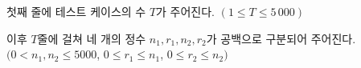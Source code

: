첫째 줄에 테스트 케이스의 수 $T$가 주어진다. $(1 \le T \le 5\,000)$

이후 $T$줄에 걸쳐 네 개의 정수 $n_1, r_1, n_2, r_2$가 공백으로 구분되어 주어진다. $(0 < n_1, n_2 \leq 5000$, $0 \leq r_1 \leq n_1$, $0 \leq r_2 \leq n_2)$
